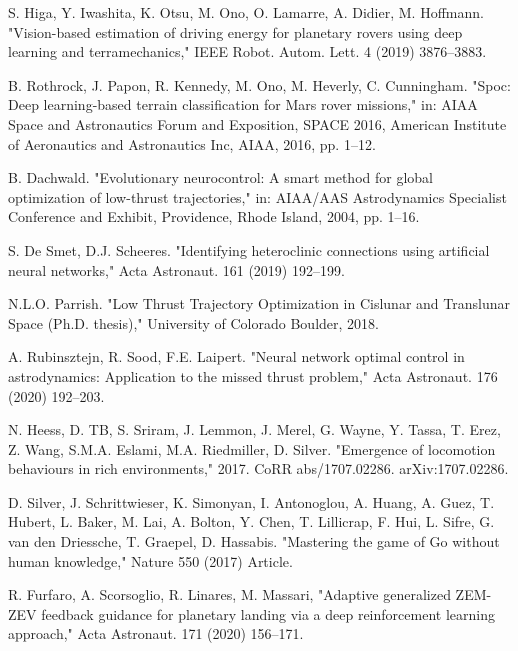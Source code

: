 \documentclass[a4paper]{article}
\begin{document}
\begin{thebibliography}{1}
		S. Higa, Y. Iwashita, K. Otsu, M. Ono, O. Lamarre, A. Didier, M. Hoffmann.
		"Vision-based estimation of driving energy for planetary rovers using deep learning and terramechanics,"
		IEEE Robot. Autom. Lett. 4 (2019) 3876–3883.
		
		B. Rothrock, J. Papon, R. Kennedy, M. Ono, M. Heverly, C. Cunningham.
		"Spoc: Deep learning-based terrain classification for Mars rover missions,"
		in: AIAA Space and Astronautics Forum and Exposition, SPACE 2016,
		American Institute of Aeronautics and Astronautics Inc, AIAA, 2016, pp. 1–12.
		
		B. Dachwald.
		"Evolutionary neurocontrol: A smart method for global optimization of low-thrust trajectories,"
		in: AIAA/AAS Astrodynamics Specialist Conference and Exhibit,
		Providence, Rhode Island, 2004, pp. 1–16.
		
		S. De Smet, D.J. Scheeres.
		"Identifying heteroclinic connections using artificial neural networks,"
		Acta Astronaut. 161 (2019) 192–199.
		
		N.L.O. Parrish.
		"Low Thrust Trajectory Optimization in Cislunar and Translunar Space (Ph.D. thesis),"
		University of Colorado Boulder, 2018.
		
		A. Rubinsztejn, R. Sood, F.E. Laipert.
		"Neural network optimal control in astrodynamics: Application to the missed thrust problem,"
		Acta Astronaut. 176 (2020) 192–203.
		
		N. Heess, D. TB, S. Sriram, J. Lemmon, J. Merel, G. Wayne, Y. Tassa, T. Erez, Z. Wang, S.M.A. Eslami, M.A. Riedmiller, D. Silver.
		"Emergence of locomotion behaviours in rich environments," 2017.
		CoRR abs/1707.02286.
		arXiv:1707.02286.
		
		D. Silver, J. Schrittwieser, K. Simonyan, I. Antonoglou, A. Huang, A. Guez, T. Hubert, L. Baker, M. Lai, A. Bolton, Y. Chen, T. Lillicrap, F. Hui, L. Sifre, G. van den Driessche, T. Graepel, D. Hassabis.
		"Mastering the game of Go without human knowledge," Nature 550 (2017) Article.
		
		R. Furfaro, A. Scorsoglio, R. Linares, M. Massari,
		"Adaptive generalized ZEM-ZEV feedback guidance for planetary landing via a deep reinforcement learning approach,"
		Acta Astronaut. 171 (2020) 156–171.
		

\end{thebibliography}
\end{document}
